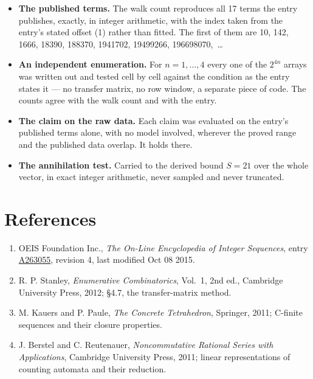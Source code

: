 \documentclass[11pt]{article}
\theoremstyle{definition}
\begin{document}
\begin{itemize}

\item {\bfseries The published terms.} The walk count reproduces all 17 terms the entry publishes, exactly, in integer arithmetic, with the index taken from the entry's stated offset (1) rather than fitted. The first of them are 10, 142, 1666, 18390, 188370, 1941702, 19499266, 196698070,~\dots

\item {\bfseries An independent enumeration.} For $n = 1,\dots,4$ every one of the $2^{4n}$ arrays was written out and tested cell by cell against the condition as the entry states it --- no transfer matrix, no row window, a separate piece of code. The counts agree with the walk count and with the entry.

\item {\bfseries The claim on the raw data.} Each claim was evaluated on the entry's published terms alone, with no model involved, wherever the proved range and the published data overlap. It holds there.

\item {\bfseries The annihilation test.} Carried to the derived bound $S = 21$ over the whole vector, in exact integer arithmetic, never sampled and never truncated.

\end{itemize}

\section{References}

\begin{enumerate}

\item OEIS Foundation Inc., \emph{The On-Line Encyclopedia of Integer Sequences}, entry \href{https://oeis.org/A263055}{A263055}, revision 4, last modified Oct 08 2015.

\item R. P. Stanley, \emph{Enumerative Combinatorics}, Vol.~1, 2nd ed., Cambridge University Press, 2012; \S4.7, the transfer-matrix method.

\item M. Kauers and P. Paule, \emph{The Concrete Tetrahedron}, Springer, 2011; C-finite sequences and their closure properties.

\item J. Berstel and C. Reutenauer, \emph{Noncommutative Rational Series with Applications}, Cambridge University Press, 2011; linear representations of counting automata and their reduction.

\end{enumerate}
\end{document}
